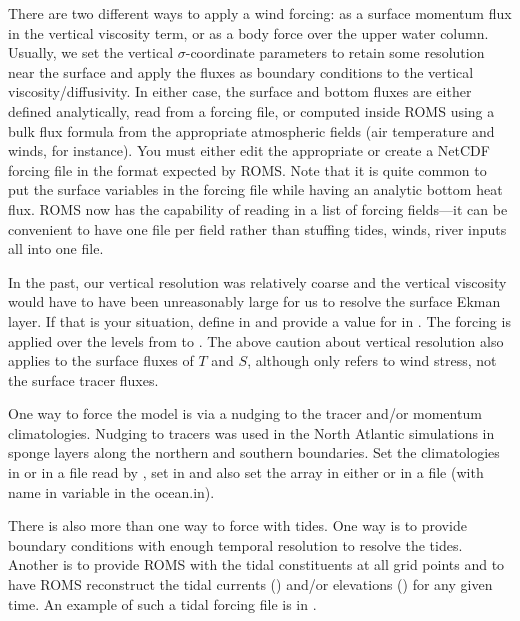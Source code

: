 There are two different ways to apply a wind forcing: as a surface
momentum flux in the vertical viscosity term, or as a body force over
the upper water column.
Usually, we set the vertical $\sigma$-coordinate
parameters to retain some resolution near the surface and apply the
fluxes as boundary conditions to the vertical viscosity/diffusivity.
In either case, the surface and bottom fluxes are either defined
analytically, read from a forcing file, or computed inside ROMS
using a bulk flux formula from the appropriate atmospheric fields
(air temperature and winds, for instance).  You must either edit the
appropriate  or create a NetCDF forcing
file in the format expected by ROMS. Note that it is quite common
to put the surface variables in the forcing file while having an analytic
bottom heat flux. ROMS now has the capability of reading in a list
of forcing fields---it can be convenient to have one file per field
rather than stuffing tides, winds, river inputs all into one file.

In the past, our vertical resolution was relatively coarse and the
vertical viscosity would have to have been unreasonably large for
us to resolve the surface Ekman layer.  If that is your situation,
define  in  and provide a value for
 in .  The forcing is applied over the
levels from  to .  The above caution about
vertical resolution also applies to the surface fluxes of $T$ and
$S$, although  only refers to wind stress, not the
surface tracer fluxes.

\smallskip
{}

One way to force the model is via a nudging to the tracer and/or
momentum climatologies. Nudging to tracers was used in the North
Atlantic simulations in sponge layers along the northern and southern
boundaries. Set the climatologies in  or in a
file read by , set  in
 and also set the array  in
either  or in a file (with name in 
variable in the ocean.in).

\smallskip
{}

There is also more than one way to force with tides. One way is to
provide boundary conditions with enough temporal resolution to
resolve the tides. Another is to provide ROMS with the tidal
constituents at all grid points and to have ROMS reconstruct the
tidal currents ()  and/or elevations ()
for any given time. An example of such a tidal forcing file is in
.


